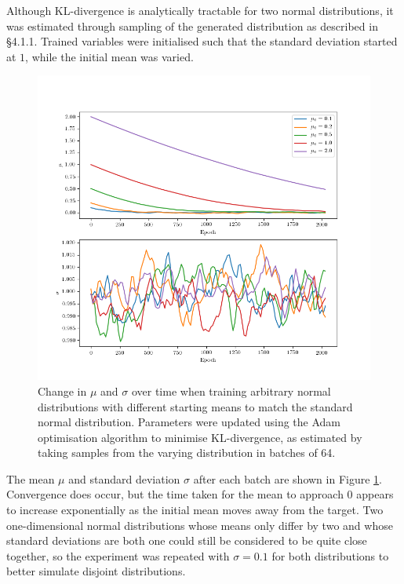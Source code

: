 \documentclass[../../main.tex]{subfiles}
\begin{document}
Although KL-divergence is analytically tractable for two normal distributions, it was estimated through sampling of the generated distribution as described in \S4.1.1.
Trained variables were initialised such that the standard deviation started at $1$, while the initial mean was varied.
\begin{figure}[H]
    \begin{center}
    \includegraphics[width=\textwidth]{broadKLDivergence}
    \caption{
        Change in $\mu$ and $\sigma$ over time when training arbitrary normal distributions with different starting means to match the standard normal distribution. 
        Parameters were updated using the Adam optimisation algorithm to minimise KL-divergence, as estimated by taking samples from the varying distribution in batches of 64.
    }
    \label{fig:broadKLDivergence}
    \end{center}
\end{figure}
The mean $\mu$ and standard deviation $\sigma$ after each batch are shown in Figure \ref{fig:broadKLDivergence}.
Convergence does occur, but the time taken for the mean to approach $0$ appears to increase exponentially as the initial mean moves away from the target.
Two one-dimensional normal distributions whose means only differ by two and whose standard deviations are both one could still be considered to be quite close together, so the experiment was repeated with $\sigma=0.1$ for both distributions to better simulate disjoint distributions.
\end{document}
